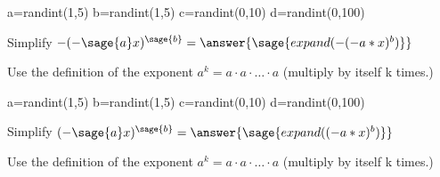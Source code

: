 \documentclass{ximera}
\begin{document}
\begin{problem}
\begin{sagesilent}
a=randint(1,5)
b=randint(1,5)
c=randint(0,10)
d=randint(0,100)
\end{sagesilent}
Simplify $-(-\sage{a}x)^{\sage{b}}=\answer{\sage{expand(-(-a*x)^b)}}$

\begin{hint}
Use the definition of the exponent $a^k=a\cdot a\cdot \ldots \cdot a$ (multiply by itself k times.)
\end{hint}
\end{problem}


\begin{problem}
\begin{sagesilent}
a=randint(1,5)
b=randint(1,5)
c=randint(0,10)
d=randint(0,100)
\end{sagesilent}
Simplify $(-\sage{a}x)^{\sage{b}}=\answer{\sage{expand((-a*x)^b)}}$

\begin{hint}
Use the definition of the exponent $a^k=a\cdot a\cdot \ldots \cdot a$ (multiply by itself k times.)
\end{hint}
\end{problem}
\end{document}
